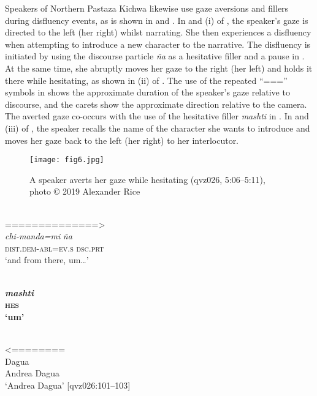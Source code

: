 \documentclass[output=paper]{langscibook}
\begin{document}
Speakers of Northern Pastaza Kichwa likewise use gaze aversions and fillers during disfluency events, as is shown in  and . In  and (i) of , the speaker’s gaze is directed to the left (her right) whilst narrating. She then experiences a disfluency when attempting to introduce a new character to the narrative. The disfluency is initiated by using the discourse particle \textit{ña} as a hesitative filler and a pause in . At the same time, she abruptly moves her gaze to the right (her left) and holds it there while hesitating, as shown in (ii) of . The use of the repeated “===” symbols in  shows the approximate duration of the speaker’s gaze relative to discourse, and the carets show the approximate direction relative to the camera. The averted gaze co-occurs with the use of the hesitative filler \textit{mashti} in . In  and (iii) of , the speaker recalls the name of the character she wants to introduce and moves her gaze back to the left (her right) to her interlocutor.

  
\begin{figure}
\texttt{[image: fig6.jpg]}
\caption{\label{fig:rice:6} A speaker averts her gaze while hesitating (qvz026, 5:06--5:11), photo © 2019 Alexander Rice}
\end{figure}

\ea%
\label{ex:rice:27}
\ea  \label{ex:rice:27a}
 {} \\
{} {==============>} \\
{\textit{{chi-manda=mi}}} {{\textit{ña} {\hspace{1mm}}{}}}\\
{\textsc{dist.dem-abl=ev.s}} {\textsc{dsc.prt}}\\
\glt ‘and from there, um…’
\medskip

\ex  \label{ex:rice:27b}
\glll {===>} \\
{\textbf{\textit{mashti}}} \\
{\textbf{\textsc{hes}}} \\
\glt \textbf{‘um’}
\medskip

\ex \label{ex:rice:27c}
 \\
\glt <======== \\
 {Dagua} \\
{Andrea} {Dagua} \\
\glt ‘Andrea Dagua’ [qvz026:101--103]
\z\z
\end{document}
